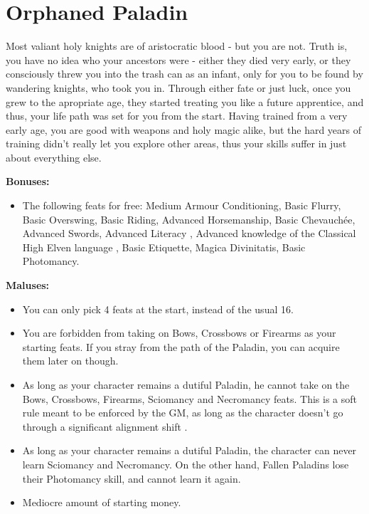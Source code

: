 \section{Orphaned Paladin}
Most valiant holy knights are of aristocratic blood - but you are not. Truth is, you have no idea who your ancestors were - either they died very early, or they consciously threw you into the trash can as an infant, only for you to be found by wandering knights, who took you in. Through either fate or just luck, once you grew to the apropriate age, they started treating you like a future apprentice, and thus, your life path was set for you from the start. Having trained from a very early age, you are good with weapons and holy magic alike, but the hard years of training didn't really let you explore other areas, thus your skills suffer in just about everything else.


\textbf{Bonuses:}
\begin{itemize}
	\item The following feats for free: Medium Armour Conditioning, Basic Flurry, Basic Overswing, Basic Riding, Advanced Horsemanship, Basic Chevauchée, Advanced Swords, Advanced Literacy , Advanced knowledge of the Classical High Elven language , Basic Etiquette, Magica Divinitatis, Basic Photomancy.
\end{itemize}


\textbf{Maluses:}
\begin{itemize}
	\item You can only pick 4 feats at the start, instead of the usual 16.
	\item You are forbidden from taking on Bows, Crossbows or Firearms as your starting feats. If you stray from the path of the Paladin, you can acquire them later on though.
	\item As long as your character remains a dutiful Paladin, he cannot take on the Bows, Crossbows, Firearms, Sciomancy and Necromancy feats. This is a soft rule meant to be enforced by the GM, as long as the character doesn't go through a significant alignment shift .
	\item As long as your character remains a dutiful Paladin, the character can never learn Sciomancy and Necromancy. On the other hand, Fallen Paladins lose their Photomancy skill, and cannot learn it again.
	\item Mediocre amount of starting money.
\end{itemize}
